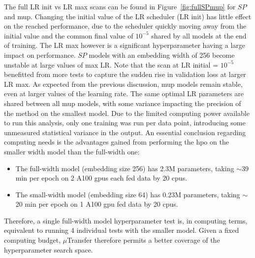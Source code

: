 The full LR init vs LR max scans can be found in Figure~\ref{fig:fullSPmup} for $SP$ and \gls{mup}. Changing the initial value of the LR scheduler (LR init) has little effect on the reached performance, due to the scheduler quickly moving away from the initial value and the common final value of $10^{-5}$ shared by all models at the end of training. The LR max however is a significant hyperparameter having a large impact on performance. $SP$ models with an embedding width of 256 become unstable at large values of max LR. Note that the scan at LR initial = $10^{-5}$ benefitted from more tests to capture the sudden rise in validation loss at larger LR max. As expected from the previous discussion, \gls{mup} models remain stable, even at larger values of the learning rate. The same optimal LR parameters are shared between all \gls{mup} models, with some variance impacting the precision of the method on the smallest model. Due to the limited computing power available to run this analysis, only one training was run per data point, introducing some unmeasured statistical variance in the output. An essential conclusion regarding computing needs is the advantages gained from performing the \gls{hpo} on the smaller width model than the full-width one:
\begin{itemize}
  \item The full-width model (embedding size 256) has 2.3M parameters, taking $\sim$39 min per epoch on 2 A100 \glspl{gpu} each fed data by 20 \glspl{cpu}.
  \item The small-width model (embedding size 64) has 0.23M parameters, taking $\sim$20 min per epoch on 1 A100 \gls{gpu} fed data by 20 \glspl{cpu}.
\end{itemize}
Therefore, a single full-width model hyperparameter test is, in computing terms, equivalent to running 4 individual tests with the smaller model. Given a fixed computing budget, $\mu$Transfer therefore permits a better coverage of the hyperparameter search space.\\

